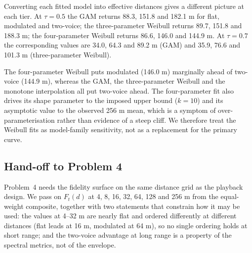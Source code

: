 Converting each fitted model into effective distances gives a different picture at each
tier. At $\tau=0.5$ the GAM returns 88.3, 151.8 and 182.1 m for flat, modulated and
two-voice; the three-parameter Weibull returns 89.7, 151.8 and 188.3 m; the four-parameter
Weibull returns 86.6, 146.0 and 144.9 m. At $\tau=0.7$ the corresponding values are 34.0,
64.3 and 89.2 m (GAM) and 35.9, 76.6 and 101.3 m (three-parameter Weibull).

The four-parameter Weibull puts modulated (146.0 m) marginally ahead of two-voice
(144.9 m), whereas the GAM, the three-parameter Weibull and the monotone interpolation all put
two-voice ahead. The four-parameter fit also drives its shape parameter to the imposed upper
bound ($k=10$) and its asymptotic value to the observed 256 m mean, which is a symptom of
over-parameterisation rather than evidence of a steep cliff. We therefore treat the Weibull
fits as model-family sensitivity, not as a replacement for the primary curve.

\subsection{Hand-off to Problem 4}

Problem~4 needs the fidelity surface on the same distance grid as the playback design. We pass on
$F_t(d)$ at 4, 8, 16, 32, 64, 128 and 256 m from the equal-weight composite, together with two
statements that constrain how it may be used: the values at 4--32 m are nearly flat and ordered
differently at different distances (flat leads at 16 m, modulated at 64 m), so no single ordering
holds at short range; and the two-voice advantage at long range is a property of the spectral
metrics, not of the envelope.
